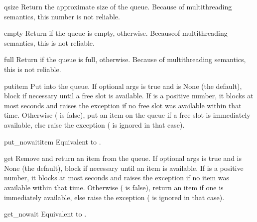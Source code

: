 \begin{methoddesc}{qsize}{}
Return the approximate size of the queue.  Because of multithreading
semantics, this number is not reliable.
\end{methoddesc}

\begin{methoddesc}{empty}{}
Return  if the queue is empty,  otherwise.
Becauseof multithreading semantics, this is not reliable.
\end{methoddesc}

\begin{methoddesc}{full}{}
Return  if the queue is full,  otherwise.
Because of multithreading semantics, this is not reliable.
\end{methoddesc}

\begin{methoddesc}{put}{item}
Put  into the queue. If optional args  is true
and  is None (the default), block if necessary until a
free slot is available. If  is a positive number, it
blocks at most  seconds and raises the 
exception if no free slot was available within that time.
Otherwise ( is false), put an item on the queue if a free
slot is immediately available, else raise the 
exception ( is ignored in that case).


\end{methoddesc}

\begin{methoddesc}{put_nowait}{item}
Equivalent to .
\end{methoddesc}

\begin{methoddesc}{get}{}
Remove and return an item from the queue. If optional args
 is true and  is None (the default),
block if necessary until an item is available. If  is
a positive number, it blocks at most  seconds and raises
the  exception if no item was available within that
time. Otherwise ( is false), return an item if one is
immediately available, else raise the  exception
( is ignored in that case).


\end{methoddesc}

\begin{methoddesc}{get_nowait}{}
Equivalent to .
\end{methoddesc}
